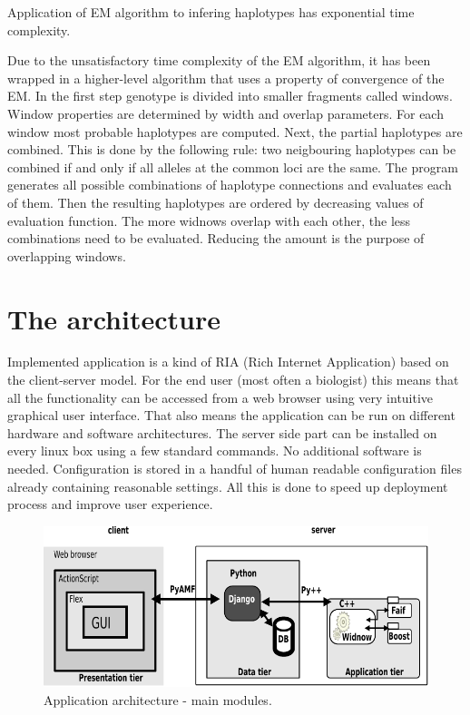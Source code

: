 \documentclass[]{spie}
\begin{document}
Application of EM algorithm to infering haplotypes has exponential time complexity.

Due to the unsatisfactory time complexity of the EM algorithm, it has been wrapped in a higher-level algorithm that uses a property of convergence of the EM.
In the first step genotype is divided into smaller fragments called windows.
Window properties are determined by width and overlap parameters.
For each window most probable haplotypes are computed.
Next, the partial haplotypes are combined.
This is done by the following rule: two neigbouring haplotypes can be combined if and only if all alleles at the common loci are the same.
The program generates all possible combinations of haplotype connections and evaluates each of them.
Then the resulting haplotypes are ordered by decreasing values of evaluation function.
The more widnows overlap with each other, the less combinations need to be evaluated.
Reducing the amount is the purpose of overlapping windows.

\section{The architecture}

Implemented application is a kind of RIA (Rich Internet Application) based on the client-server model.
For the end user (most often a biologist) this means that all the functionality can be accessed from a web browser using very intuitive graphical user interface.
That also means the application can be run on different hardware and software architectures.
The server side part can be installed on every linux box using a few standard commands.
No additional software is needed.
Configuration is stored in a handful of human readable configuration files already containing reasonable settings.
All this is done to speed up deployment process and improve user experience.

\begin{figure}[!htb]
\centering
\includegraphics{images/scheme2}
\caption{Application architecture - main modules.}
\label{fig:scheme}
\end{figure}
\end{document}
